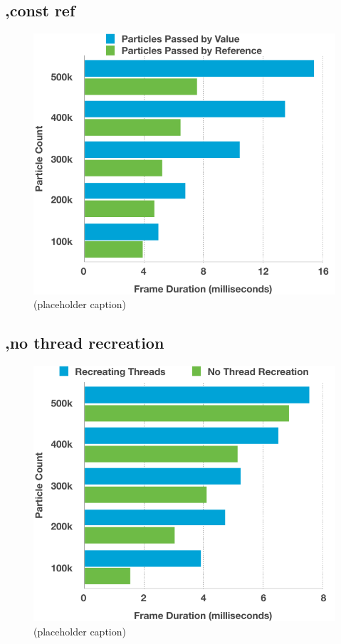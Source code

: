 \documentclass[11pt, a4paper, twocolumn]{article}
\begin{document}
\subsection{,const ref}

\begin{figure}[h]
\includegraphics[width=\linewidth]{pass-by-value-reference}
\caption{(placeholder caption)}
\label{fig:pass-by-value-reference}
\end{figure}

\subsection{,no thread recreation}

\begin{figure}[h]
\includegraphics[width=\linewidth]{recreate-no-recreation}
\caption{(placeholder caption)}
\label{fig:recreate-no-recreation}
\end{figure}
\end{document}
